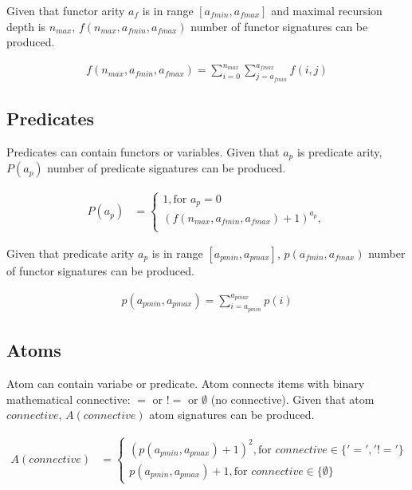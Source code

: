 Given that functor arity $a_f$ is in range $[a_{fmin}, a_{fmax}]$  and maximal recursion depth is $n_{max}$, $f(n_{max}, a_{fmin}, a_{fmax})$ number of functor signatures can be produced.

\begin{align}
  f(n_{max}, a_{fmin}, a_{fmax}) = \sum_{i=0}^{n_{max}} \sum_{j=a_{fmin}}^{a_{fmax}} f(i, j) \label{eq:functor}
\end{align}

\subsection{Predicates}

Predicates can contain functors or variables.
Given that $a_p$ is predicate arity, $P(a_p)$ number of predicate signatures can be produced.

\begin{align}
	P(a_p) &=
	\begin{cases}
		1, \text{for } a_p = 0 \\
		(f(n_{max}, a_{fmin}, a_{fmax}) + 1)^{a_p}, \\
	\end{cases}
\end{align}

Given that predicate arity $a_p$ is in range $[a_{pmin}, a_{pmax}]$, $p(a_{fmin}, a_{fmax})$ number of functor signatures can be produced.

\begin{align}
  p(a_{pmin}, a_{pmax}) = \sum_{i=a_{pmin}}^{a_{pmax}} p(i) \label{eq:predicate}
\end{align}

\subsection{Atoms}

Atom can contain variabe or predicate. Atom connects items with binary mathematical connective: $=$ or $!=$ or $\emptyset$ (no connective).
Given that atom $connective$, $A(connective)$ atom signatures can be produced.

\begin{align}
	A(connective) &= 
  \begin{cases}
    (p(a_{pmin}, a_{pmax}) + 1)^{2}, \text{for } connective \in \{'=', '!='\} \\
    p(a_{pmin}, a_{pmax}) + 1, \text{for } connective \in \{\emptyset\} \label{eq:atom}
  \end{cases}
\end{align}

